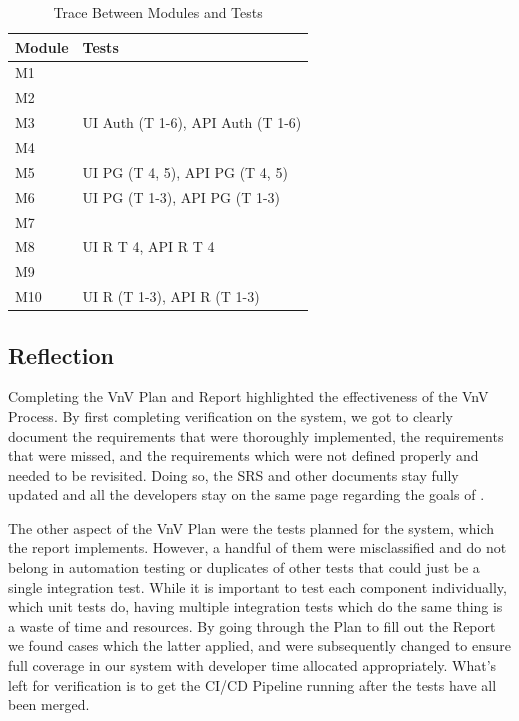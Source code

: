 \documentclass[12pt, titlepage]{article}
\begin{document}
\begin{table}[H]
	\caption{Trace Between Modules and Tests}
	\centering
	\begin{tabular}{p{} p{}}
		\toprule
		\textbf{Module} & \textbf{Tests}\\
		\midrule
		M1 & \\
		M2 & \\
		M3 & UI Auth (T 1-6), API Auth (T 1-6) \\
		M4 & \\
		M5 & UI PG (T 4, 5), API PG (T 4, 5)\\
		M6 & UI PG (T 1-3), API PG (T 1-3)\\
		M7 & \\
		M8 & UI R T 4, API R T 4\\
		M9 & \\
		M10 & UI R (T 1-3), API R (T 1-3)\\
		\bottomrule
	\end{tabular}
	
	\label{TblRT}
\end{table}

\subsection*{Reflection}
Completing the VnV Plan and Report highlighted the effectiveness of the VnV Process. By first completing verification on the system, we got to clearly document the requirements that were thoroughly implemented, the requirements that were missed, and the requirements which were not defined properly and needed to be revisited. Doing so, the SRS and other documents stay fully updated and all the developers stay on the same page regarding the goals of \progname . 

\noindent The other aspect of the VnV Plan were the tests planned for the system, which the report implements. However, a handful of them were misclassified and do not belong in automation testing or duplicates of other tests that could just be a single integration test. While it is important to test each component individually, which unit tests do, having multiple integration tests which do the same thing is a waste of time and resources. By going through the Plan to fill out the Report we found cases which the latter applied, and were subsequently changed to ensure full coverage in our system with developer time allocated appropriately. What's left for verification is to get the CI/CD Pipeline running after the tests have all been merged.




\end{document}
